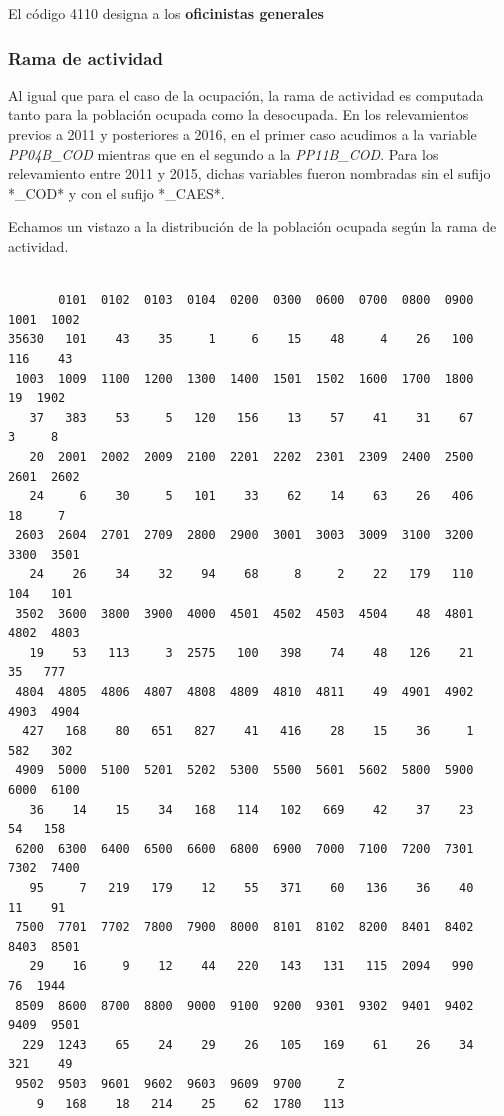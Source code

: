 \documentclass[
]{article}
\newenvironment{Shaded}{\begin{snugshade}}{\end{snugshade}}
\newcommand{\FunctionTok}[1]{\textcolor[rgb]{0.13,0.29,0.53}{\textbf{#1}}}
\newcommand{\NormalTok}[1]{#1}
\newcommand{\SpecialCharTok}[1]{\textcolor[rgb]{0.81,0.36,0.00}{\textbf{#1}}}
\begin{document}
El código 4110 designa a los \textbf{oficinistas generales}

\hypertarget{rama-de-actividad-1}{%
\subsubsection{Rama de actividad}\label{rama-de-actividad-1}}

Al igual que para el caso de la ocupación, la rama de actividad es computada tanto para la población ocupada como la desocupada. En los relevamientos previos a 2011 y posteriores a 2016, en el primer caso acudimos a la variable \emph{PP04B\_COD} mientras que en el segundo a la \emph{PP11B\_COD}. Para los relevamiento entre 2011 y 2015, dichas variables fueron nombradas sin el sufijo *\_COD* y con el sufijo *\_CAES*.

Echamos un vistazo a la distribución de la población ocupada según la rama de actividad.

\begin{Shaded}
\end{Shaded}

\begin{verbatim}

       0101  0102  0103  0104  0200  0300  0600  0700  0800  0900  1001  1002 
35630   101    43    35     1     6    15    48     4    26   100   116    43 
 1003  1009  1100  1200  1300  1400  1501  1502  1600  1700  1800    19  1902 
   37   383    53     5   120   156    13    57    41    31    67     3     8 
   20  2001  2002  2009  2100  2201  2202  2301  2309  2400  2500  2601  2602 
   24     6    30     5   101    33    62    14    63    26   406    18     7 
 2603  2604  2701  2709  2800  2900  3001  3003  3009  3100  3200  3300  3501 
   24    26    34    32    94    68     8     2    22   179   110   104   101 
 3502  3600  3800  3900  4000  4501  4502  4503  4504    48  4801  4802  4803 
   19    53   113     3  2575   100   398    74    48   126    21    35   777 
 4804  4805  4806  4807  4808  4809  4810  4811    49  4901  4902  4903  4904 
  427   168    80   651   827    41   416    28    15    36     1   582   302 
 4909  5000  5100  5201  5202  5300  5500  5601  5602  5800  5900  6000  6100 
   36    14    15    34   168   114   102   669    42    37    23    54   158 
 6200  6300  6400  6500  6600  6800  6900  7000  7100  7200  7301  7302  7400 
   95     7   219   179    12    55   371    60   136    36    40    11    91 
 7500  7701  7702  7800  7900  8000  8101  8102  8200  8401  8402  8403  8501 
   29    16     9    12    44   220   143   131   115  2094   990    76  1944 
 8509  8600  8700  8800  9000  9100  9200  9301  9302  9401  9402  9409  9501 
  229  1243    65    24    29    26   105   169    61    26    34   321    49 
 9502  9503  9601  9602  9603  9609  9700     Z 
    9   168    18   214    25    62  1780   113 
\end{verbatim}
\end{document}
